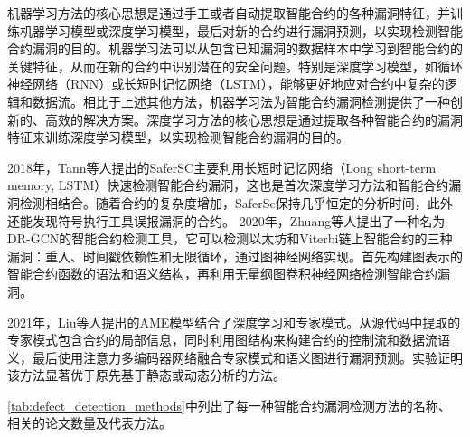    机器学习方法的核心思想是通过手工或者自动提取智能合约的各种漏洞特征，并训练机器学习模型或深度学习模型，最后对新的合约进行漏洞预测，以实现检测智能合约漏洞的目的。机器学习法可以从包含已知漏洞的数据样本中学习到智能合约的关键特征，从而在新的合约中识别潜在的安全问题。特别是深度学习模型，如循环神经网络（RNN）或长短时记忆网络（LSTM），能够更好地应对合约中复杂的逻辑和数据流。相比于上述其他方法，机器学习法为智能合约漏洞检测提供了一种创新的、高效的解决方案。深度学习方法的核心思想是通过提取各种智能合约的漏洞特征来训练深度学习模型，以实现检测智能合约漏洞的目的\cite{xuejialei}。

    2018年，Tann等人提出的SaferSC\cite{tann2018towards}主要利用长短时记忆网络（Long short-term memory, LSTM）快速检测智能合约漏洞，这也是首次深度学习方法和智能合约漏洞检测相结合。随着合约的复杂度增加，SaferSc保持几乎恒定的分析时间，此外还能发现符号执行工具误报漏洞的合约。
    2020年，Zhuang等人提出了一种名为DR-GCN\cite{zhuang2021smart}的智能合约检测工具，它可以检测以太坊和Viterbi链上智能合约的三种漏洞：重入、时间戳依赖性和无限循环，通过图神经网络实现。首先构建图表示的智能合约函数的语法和语义结构，再利用无量纲图卷积神经网络检测智能合约漏洞。
    
    2021年，Liu等人提出的AME\cite{liu2021smart}模型结合了深度学习和专家模式。从源代码中提取的专家模式包含合约的局部信息，同时利用图结构来构建合约的控制流和数据流语义，最后使用注意力多编码器网络融合专家模式和语义图进行漏洞预测。实验证明该方法显著优于原先基于静态或动态分析的方法。



\autoref{tab:defect_detection_methods}中列出了每一种智能合约漏洞检测方法的名称、相关的论文数量及代表方法。

